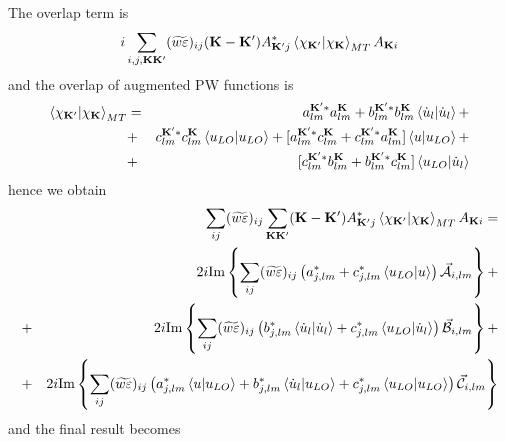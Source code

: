 \documentclass[aps,prb,floatfix,epsfig,singlecolumn,showpacs,preprintnumbers]{revtex4}
\newcommand{\vK}{{\mathbf{K}}}
\renewcommand{\Im}{\textrm{Im}}
\newcommand{\vcA}{\vec{\cal A}}
\newcommand{\vcB}{\vec{\cal B}}
\newcommand{\vcC}{\vec{\cal C}}
\begin{document}
The overlap term is
\begin{eqnarray}
i \sum_{i,j,\vK\vK'} (\widetilde{w\varepsilon})_{ij} (\vK-\vK') A^*_{\vK' j} \braket{\chi_{\vK'}|\chi_\vK}_{MT}  A_{\vK i}
\end{eqnarray}
and the overlap of augmented PW functions is
\begin{eqnarray}
\braket{\chi_{\vK'}|\chi_\vK}_{MT}&=&
a^{\vK' *}_{lm}  a_{lm}^{\vK}  + 
b^{\vK' *}_{lm}  b_{lm}^\vK \braket{\dot{u}_l|\dot{u}_l} +
\nonumber\\
&+&
c^{\vK' *}_{lm}  c_{lm}^\vK \braket{u_{LO}|u_{LO}}+
[a^{\vK' *}_{lm} c_{lm}^\vK + c^{\vK' *}_{lm} a_{lm}^\vK ]\braket{u|u_{LO}} +
\nonumber\\
&+&
[c^{\vK' *}_{lm}  b_{lm}^\vK + b^{\vK' *}_{lm}  c_{lm}^\vK ]\braket{u_{LO}|\dot{u}_l}
\end{eqnarray}
hence we obtain
\begin{eqnarray}
&& \sum_{ij}(\widetilde{w\varepsilon})_{ij}\sum_{\vK\vK'} (\vK-\vK')   A^*_{\vK' j}\braket{\chi_{\vK'}|\chi_\vK}_{MT}A_{\vK i}=
\nonumber\\
&& 2i\Im\left\{ \sum_{ij} (\widetilde{w\varepsilon})_{ij} \left(a_{j,lm}^*  + c^*_{j,lm} \braket{u_{LO}|u}\right)\vcA_{i,lm}\right\} + 
\nonumber\\
&+& 2i\Im\left\{\sum_{ij} (\widetilde{w\varepsilon})_{ij}\left( b_{j,lm}^* \braket{\dot{u}_l|\dot{u}_l} +c^*_{j,lm}  \braket{u_{LO}|\dot{u}_l} \right) \vcB_{i,lm}\right\} +
\nonumber\\
&+& 2i\Im\left\{\sum_{ij} (\widetilde{w\varepsilon})_{ij}\left(a^*_{j,lm}\braket{u|u_{LO}} + b^*_{j,lm} \braket{\dot{u}_l|u_{LO}}  +c^*_{j,lm} \braket{u_{LO}|u_{LO}} \right)\vcC_{i,lm}\right\}
\nonumber
\end{eqnarray}
and the final result becomes
\end{document}
